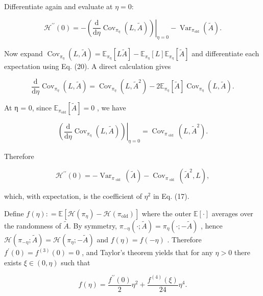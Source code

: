\documentclass[
  10
]{article}
\begin{document}
Differentiate again and evaluate at \(\eta = 0 \colon\)

\[
\mathcal {H} ^ {\prime \prime} (0) = - \left. \left(\frac {\mathrm{d}}{\mathrm{d} \eta} \operatorname{Cov} _ {\pi_ {\eta}} (L, \tilde {A})\right) \right| _ {\eta = 0} - \operatorname{Var} _ {\pi_ {\text {old}}} (\tilde {A}).
\]

Now expand
\(\operatorname { C o v } _ { \pi _ { \eta } } ( L , \tilde { A } ) = \mathbb { E } _ { \pi _ { \eta } } [ L \tilde { A } ] - \mathbb { E } _ { \pi _ { \eta } } [ L ] \mathbb { E } _ { \pi _ { \eta } } [ \tilde { A } ]\)
and differentiate each expectation using Eq. (20). A direct calculation
gives

\[
\frac {\mathrm{d}}{\mathrm{d} \eta} \operatorname{Cov} _ {\pi_ {\eta}} (L, \tilde {A}) = \operatorname{Cov} _ {\pi_ {\eta}} (L, \tilde {A} ^ {2}) - 2 \mathbb {E} _ {\pi_ {\eta}} [ \tilde {A} ] \operatorname{Cov} _ {\pi_ {\eta}} (L, \tilde {A}).
\]

At η = 0, since
\(\mathbb { E } _ { \pi _ { \mathrm { o l d } } } [ \tilde { A } ] = 0\)
, we have

\[
\left. \left(\frac {\mathrm{d}}{\mathrm{d} \eta} \operatorname{Cov} _ {\pi_ {\eta}} (L, \tilde {A})\right) \right| _ {\eta = 0} = \operatorname{Cov} _ {\pi_ {\text { old }}} (L, \tilde {A} ^ {2}). \tag {21}
\]

Therefore

\[
\mathcal {H} ^ {\prime \prime} (0) = - \operatorname{Var} _ {\pi_ {\text { old }}} (\tilde {A}) - \operatorname{Cov} _ {\pi_ {\text { old }}} (\tilde {A} ^ {2}, L), \tag {22}
\]

which, with expectation, is the coefficient of \(\eta ^ { 2 }\) in Eq.
(17).

Define
\(f ( \eta ) : = \mathbb { E } [ \mathcal { H } ( \pi _ { \eta } ) - \mathcal { H } ( \pi _ { \mathrm { o l d } } ) ]\)
where the outer \(\mathbb { E } [ \cdot ]\) averages over the randomness
of \({ \tilde { A } } .\) By symmetry,
\(\pi _ { - \eta } ( \cdot ; \tilde { A } ) = \pi _ { \eta } ( \cdot ; - \tilde { A } )\)
, hence
\(\mathcal { H } ( \pi _ { - \eta } ; \tilde { A } ) = \mathcal { H } ( \pi _ { \eta } ; - \tilde { A } )\)
and \(f ( \eta ) = f ( - \eta )\) . Therefore
\(f ^ { \prime } ( 0 ) = f ^ { ( 3 ) } ( 0 ) = 0\) , and Taylor's
theorem yields that for any \(\eta > 0\) there exists
\(\xi \in ( 0 , \eta )\) such that

\[
f (\eta) = \frac {f ^ {\prime \prime} (0)}{2} \eta^ {2} + \frac {f ^ {(4)} (\xi)}{2 4} \eta^ {4}.
\]
\end{document}
